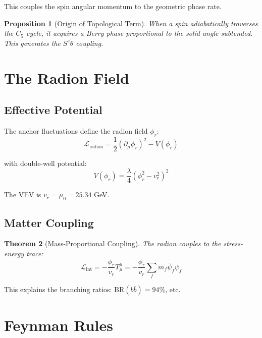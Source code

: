 \documentclass[11pt,a4paper]{article}
\newtheorem{theorem}{Theorem}[section]
\newtheorem{proposition}[theorem]{Proposition}
\theoremstyle{definition}
\newcommand{\murad}{\mu_0}
\newcommand{\LL}{\mathcal{L}}
\begin{document}
This couples the spin angular momentum to the geometric phase rate.

\begin{proposition}[Origin of Topological Term]
When a spin adiabatically traverses the $C_5$ cycle, it acquires a Berry phase proportional to the solid angle subtended. This generates the $S^z \dot{\theta}$ coupling.
\end{proposition}

\section{The Radion Field}

\subsection{Effective Potential}

The anchor fluctuations define the radion field $\phi_r$:
\begin{equation}
\LL_{\text{radion}} = \frac{1}{2}(\partial_\mu \phi_r)^2 - V(\phi_r)
\end{equation}

with double-well potential:
\begin{equation}
V(\phi_r) = \frac{\lambda}{4}(\phi_r^2 - v_r^2)^2
\end{equation}

The VEV is $v_r = \murad = 25.34$ GeV.

\subsection{Matter Coupling}

\begin{theorem}[Mass-Proportional Coupling]
The radion couples to the stress-energy trace:
\begin{equation}
\LL_{\text{int}} = -\frac{\phi_r}{v_r} T^\mu_\mu = -\frac{\phi_r}{v_r} \sum_f m_f \bar{\psi}_f \psi_f
\end{equation}
\end{theorem}

This explains the branching ratios: $\text{BR}(b\bar{b}) = 94\%$, etc.

\section{Feynman Rules}
\end{document}
